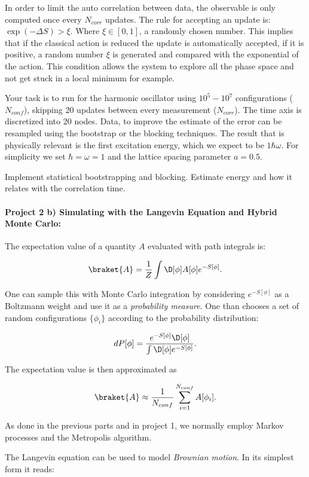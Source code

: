 \documentclass[%
oneside,                 %
final,                   %
10pt]{article}
\begin{document}
\noindent
In order to limit the auto correlation between data, the observable is
only computed once every $N_{corr}$ updates.  The rule for accepting
an update is: $\exp(-\Delta S) > \xi$. Where $\xi \in [0,1]$, a
randomly chosen number. This implies that if the classical action is
reduced the update is automatically accepted, if it is positive, a
random number $\xi$ is generated and compared with the exponential of
the action. This condition allows the system to explore all the phase
space and not get stuck in a local minimum for example.

Your task is to
run for the harmonic oscillator  using $10^5-10^7$ configurations ($N_{conf}$), skipping 20
updates between every measurement ($N_{corr}$). The time axis is
discretized into 20 nodes. Data, to improve the estimate of the error can be resampled using the bootstrap or the blocking
techniques.  The result that is physically relevant is the first
excitation energy, which we expect to be $1\hbar\omega$. For
simplicity we set $\hbar=\omega=1$ and the lattice spacing parameter
$a = 0.5$.

Implement statistical bootstrapping and blocking. 
Estimate energy and how it relates  with the correlation time.

\paragraph{Project 2 b) Simulating with the Langevin Equation and Hybrid Monte Carlo:}
The expectation value of a quantity $A$ evaluated with path integrals is:

\[
    \braket{A} = \frac{1}{Z}\int \D[\phi] A[\phi]e^{-S[\phi]}.
\]

One can sample this with Monte Carlo integration by considering
$e^{-S[\phi]}$ as a Boltzmann weight and use it as a
\textit{probability measure}. One than chooses a set of random
configurations $\{\phi_i\}$ according to the probability distribution:

\[
    dP[\phi] = \frac{e^{-S[\phi]}\D[\phi]}{\int \D[\phi] e^{-S[\phi]}}.
\]

The expectation value is then approximated as

\[
    \braket{A} \approx \frac{1}{N_{conf}} \sum_{i=1}^{N_{conf}} A[\phi_i].
\]

As done in the previous parts and in project 1, we normally employ Markov processes and the Metropolis algorithm.

The Langevin equation can be used to model \textit{Brownian motion}. In its simplest form it reads:
\end{document}
